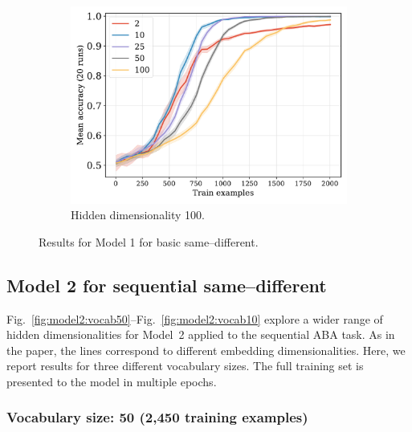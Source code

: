 \documentclass[12pt]{article}
\newcommand{\Figref}[1]{Fig.~\ref{#1}}
\begin{document}
\begin{figure}[H]
  \begin{subfigure}{0.45\linewidth}
    \includegraphics[width=1\textwidth]{fig/equality-small-train_size-embed_dim-hidden_dim=100.pdf}
    \caption{Hidden dimensionality 100.}
  \end{subfigure}
  \caption{Results for Model 1 for basic same--different.}
  \label{fig:model1}
\end{figure}



\subsection{Model 2 for sequential same--different}

\Figref{fig:model2:vocab50}--\Figref{fig:model2:vocab10} explore a wider range of hidden dimensionalities for Model~2 applied to the sequential ABA task. As in the paper, the lines correspond to different embedding dimensionalities. Here, we report results for three different vocabulary sizes. The full training set is presented to the model in multiple epochs.


\subsubsection{Vocabulary size: 50 (2,450 training examples)}

\vspace{-12pt}
\end{document}
